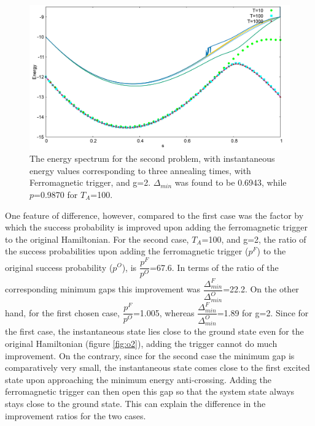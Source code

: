 \documentclass[../main.tex]{subfiles}
\begin{document}
\begin{figure}[H]
\centering 
\includegraphics[scale=0.3]{950_s12_F_g2.png}
\caption{The energy spectrum for the second problem, with instantaneous energy values corresponding to three annealing times, with Ferromagnetic trigger, and g=2. $\Delta_{min}$ was found to be 0.6943, while $p$=0.9870 for $T_A$=100.}
\label{fig:f6}
\end{figure}


One feature of difference, however, compared to the first case was the factor by which the success probability is improved upon adding the ferromagnetic trigger to the original Hamiltonian. For the second case, $T_A$=100, and g=2, the ratio of the success probabilities upon adding the ferromagnetic trigger ($p^F$) to the original success probability ($p^O$), is $\dfrac{p^F}{p^O}$=67.6. In terms of the ratio of the corresponding minimum gaps this improvement was $\dfrac{\Delta_{min}^F}{\Delta_{min}^O}$=22.2. On the other hand, for the first chosen case, $\dfrac{p^F}{p^O}$=1.005, whereas $\dfrac{\Delta_{min}^F}{\Delta_{min}^O}$=1.89 for g=2. Since for the first case, the instantaneous state lies close to the ground state even for the original Hamiltonian (figure \ref{fig:o2}), adding the trigger cannot do much improvement. On the contrary, since for the second case the minimum gap is comparatively very small, the instantaneous state comes close to the first excited state upon approaching the minimum energy anti-crossing. Adding the ferromagnetic trigger can then open this gap so that the system state always stays close to the ground state. This can explain the difference in the improvement ratios for the two cases.
\end{document}
